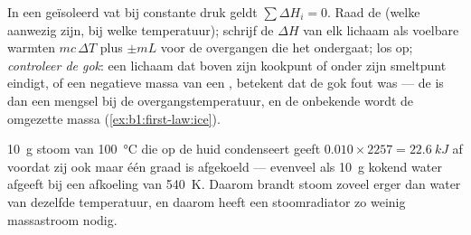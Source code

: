 \begin{method}\label{meth:b1:phase-changes:calorimetry}
In een geïsoleerd vat bij constante druk geldt $\sum\Delta H_i = 0$. Raad
de  (welke  aanwezig zijn, bij welke temperatuur);
schrijf de $\Delta H$ van elk lichaam als voelbare warmten $mc\,\Delta T$ plus  $\pm mL$ voor de overgangen die het ondergaat; los op; \emph{controleer de
gok}: een lichaam dat boven zijn kookpunt of onder zijn smeltpunt
eindigt, of een negatieve massa van een , betekent dat de gok fout was --- de
 is dan een mengsel bij de overgangstemperatuur, en de
onbekende wordt de omgezette massa (\cref{ex:b1:first-law:ice}).
\end{method}

\begin{example}\label{ex:b1:phase-changes:steam}
\qty{10}{g} stoom van \qty{100}{\degreeCelsius} die op de huid condenseert geeft
$0.010 \times 2257 = \qty{22.6}{kJ}$ af voordat zij ook maar één graad is afgekoeld ---
evenveel als \qty{10}{g} kokend water afgeeft bij een afkoeling van
\qty{540}{K}. Daarom brandt stoom zoveel erger dan water van dezelfde
temperatuur, en daarom heeft een stoomradiator zo weinig massastroom nodig.
\end{example}

